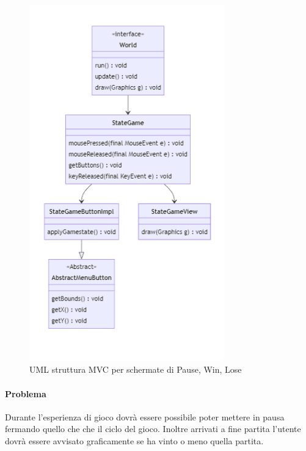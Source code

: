 \documentclass[a4paper,12pt]{report}
\begin{document}
\begin{figure}[H]
    \centering{}
    \includegraphics[width=0.75\textwidth]{img/UMLSchermatePWL.png}
    \caption{UML struttura MVC per schermate di Pause, Win, Lose}
\end{figure}

\paragraph{Problema} Durante l’esperienza di gioco dovrà essere possibile poter mettere in pausa fermando quello che che il ciclo del gioco. Inoltre arrivati a fine partita l’utente dovrà essere avvisato graficamente se ha vinto o meno quella partita.
\end{document}
